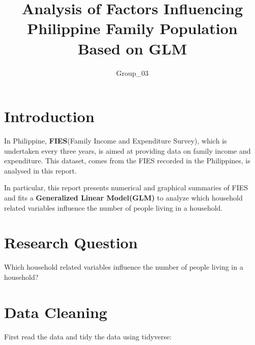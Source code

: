 \documentclass[
]{article}
\title{Analysis of Factors Influencing Philippine Family Population
Based on GLM}
\author{Group\_03}
\date{}
\begin{document}
\maketitle
\ifdefined\Shaded\renewenvironment{Shaded}{\begin{tcolorbox}[sharp corners, borderline west={3pt}{0pt}{shadecolor}, enhanced, frame hidden, interior hidden, boxrule=0pt, breakable]}{\end{tcolorbox}}\fi

\hypertarget{introduction}{%
\section{Introduction}\label{introduction}}

In Philippine, \textbf{FIES}(Family Income and Expenditure Survey),
which is undertaken every three years, is aimed at providing data on
family income and expenditure. This dataset, comes from the FIES
recorded in the Philippines, is analysed in this report.

In particular, this report presents numerical and graphical summaries of
FIES and fits a \textbf{Generalized Linear Model(GLM)} to analyze which
household related variables influence the number of people living in a
household.

\hypertarget{research-question}{%
\section{Research Question}\label{research-question}}

Which household related variables influence the number of people living
in a household?

\hypertarget{data-cleaning}{%
\section{Data Cleaning}\label{data-cleaning}}

First read the data and tidy the data using tidyverse:
\end{document}
